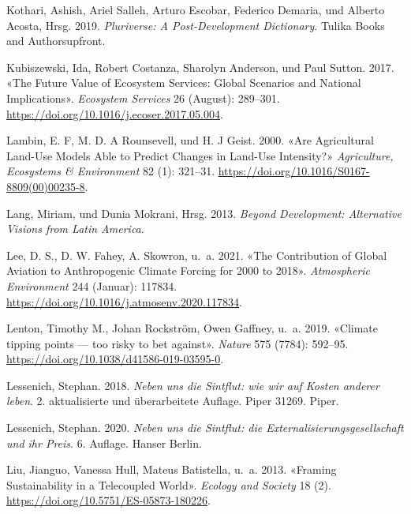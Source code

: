 \documentclass[
  nswissgerman,
  a4paper,
  openany]{book}
\newlength{\cslhangindent}
\newenvironment{CSLReferences}[2] %
 {\begin{list}{}{%
  \setlength{\itemindent}{0pt}
  \setlength{\leftmargin}{0pt}
  \setlength{\parsep}{0pt}
  \ifodd #1
   \setlength{\leftmargin}{\cslhangindent}
   \setlength{\itemindent}{-1\cslhangindent}
  \fi
  \setlength{\itemsep}{#2\baselineskip}}}
 {\end{list}}
\begin{document}
\begin{CSLReferences}{1}{1}
Kothari, Ashish, Ariel Salleh, Arturo Escobar, Federico Demaria, und
Alberto Acosta, Hrsg. 2019. \emph{Pluriverse: A Post-Development
Dictionary}. {Tulika Books and Authorsupfront}.

Kubiszewski, Ida, Robert Costanza, Sharolyn Anderson, und Paul Sutton.
2017. {«The Future Value of Ecosystem Services: {Global} Scenarios and
National Implications»}. \emph{Ecosystem Services} 26 (August):
289--301. \url{https://doi.org/10.1016/j.ecoser.2017.05.004}.

Lambin, E. F, M. D. A Rounsevell, und H. J Geist. 2000. {«Are
Agricultural Land-Use Models Able to Predict Changes in Land-Use
Intensity?»} \emph{Agriculture, Ecosystems \& Environment} 82 (1):
321--31. \url{https://doi.org/10.1016/S0167-8809(00)00235-8}.

Lang, Miriam, und Dunia Mokrani, Hrsg. 2013. \emph{Beyond {Development}:
{Alternative} Visions from {Latin America}}.

Lee, D. S., D. W. Fahey, A. Skowron, u.~a. 2021. {«The Contribution of
Global Aviation to Anthropogenic Climate Forcing for 2000 to 2018»}.
\emph{Atmospheric Environment} 244 (Januar): 117834.
\url{https://doi.org/10.1016/j.atmosenv.2020.117834}.

Lenton, Timothy M., Johan Rockström, Owen Gaffney, u.~a. 2019. {«Climate
tipping points --- too risky to bet against»}. \emph{Nature} 575 (7784):
592--95. \url{https://doi.org/10.1038/d41586-019-03595-0}.

Lessenich, Stephan. 2018. \emph{{Neben uns die Sintflut: wie wir auf
Kosten anderer leben}}. 2. aktualisierte und {ü}berarbeitete Auflage.
{Piper} 31269. Piper.

Lessenich, Stephan. 2020. \emph{{Neben uns die Sintflut: die
Externalisierungsgesellschaft und ihr Preis}}. 6. Auflage. Hanser
Berlin.

{Liu, Jianguo, Vanessa Hull, Mateus Batistella, u.~a.} 2013. {«Framing
{Sustainability} in a {Telecoupled World}»}. \emph{Ecology and Society}
18 (2). \url{https://doi.org/10.5751/ES-05873-180226}.


\end{CSLReferences}
\end{document}
